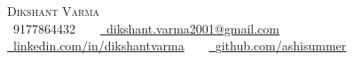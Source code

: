 \documentclass[letterpaper,11pt]{article}
\begin{document}



\begin{center}
    {\Huge \scshape Dikshant Varma} \\ \vspace{1pt}
    \vspace{1pt}
    \raisebox{-0.1\height}\ 9177864432 ~ \textbar ~
    \href{mailto:dikshant.varma2001@gmail.com}{\raisebox{-0.2\height}\ {dikshant.varma2001@gmail.com}} ~ \textbar ~
    \href{https://linkedin.com/in/dikshantvarma/}{\raisebox{-0.2\height}\ {linkedin.com/in/dikshantvarma}} ~ \textbar ~
    \href{https://github.com/ashisummer}{\raisebox{-0.2\height}\ {github.com/ashisummer}}
    \vspace{-8pt}
\end{center}
\end{document}
